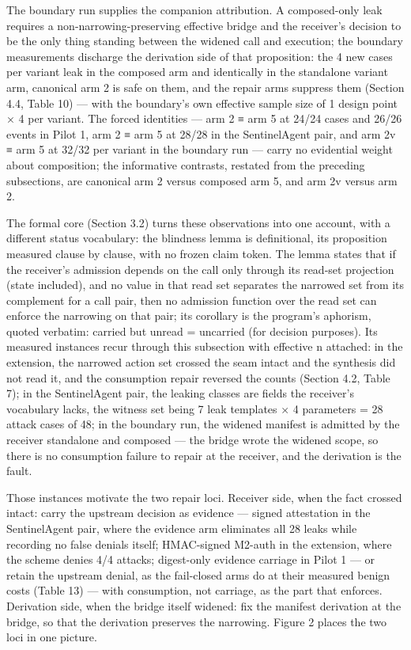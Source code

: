 \documentclass[
  10pt,
]{article}
\renewcommand{\_}{\origunderscore\allowbreak}
\begin{document}
The boundary run supplies the companion attribution. A composed-only
leak requires a non-narrowing-preserving effective bridge and the
receiver's decision to be the only thing standing between the widened
call and execution; the boundary measurements discharge the derivation
side of that proposition: the 4 new cases per variant leak in the
composed arm and identically in the standalone variant arm, canonical
arm 2 is safe on them, and the repair arms suppress them (Section 4.4,
Table 10) --- with the boundary's own effective sample size of 1 design
point × 4 per variant. The forced identities --- arm 2 ≡ arm 5 at 24/24
cases and 26/26 events in Pilot 1, arm 2 ≡ arm 5 at 28/28 in the
SentinelAgent pair, and arm 2v ≡ arm 5 at 32/32 per variant in the
boundary run --- carry no evidential weight about composition; the
informative contrasts, restated from the preceding subsections, are
canonical arm 2 versus composed arm 5, and arm 2v versus arm 2.

The formal core (Section 3.2) turns these observations into one account,
with a different status vocabulary: the blindness lemma is definitional,
its proposition measured clause by clause, with no frozen claim token.
The lemma states that if the receiver's admission depends on the call
only through its read-set projection (state included), and no value in
that read set separates the narrowed set from its complement for a call
pair, then no admission function over the read set can enforce the
narrowing on that pair; its corollary is the program's aphorism, quoted
verbatim: carried but unread = uncarried (for decision purposes). Its
measured instances recur through this subsection with effective n
attached: in the extension, the narrowed action set crossed the seam
intact and the synthesis did not read it, and the consumption repair
reversed the counts (Section 4.2, Table 7); in the SentinelAgent pair,
the leaking classes are fields the receiver's vocabulary lacks, the
witness set being 7 leak templates × 4 parameters = 28 attack cases of
48; in the boundary run, the widened manifest is admitted by the
receiver standalone and composed --- the bridge wrote the widened scope,
so there is no consumption failure to repair at the receiver, and the
derivation is the fault.

Those instances motivate the two repair loci. Receiver side, when the
fact crossed intact: carry the upstream decision as evidence --- signed
attestation in the SentinelAgent pair, where the evidence arm eliminates
all 28 leaks while recording no false denials itself; HMAC-signed
M2-auth in the extension, where the scheme denies 4/4 attacks;
digest-only evidence carriage in Pilot 1 --- or retain the upstream
denial, as the fail-closed arms do at their measured benign costs (Table
13) --- with consumption, not carriage, as the part that enforces.
Derivation side, when the bridge itself widened: fix the manifest
derivation at the bridge, so that the derivation preserves the
narrowing. Figure 2 places the two loci in one picture.
\end{document}
